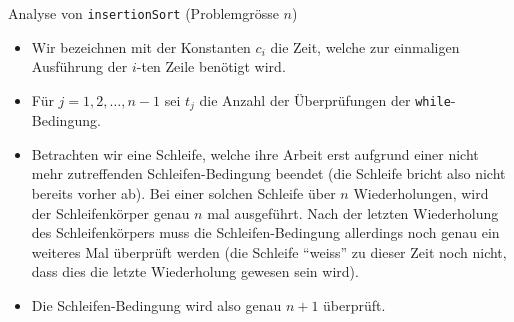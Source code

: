 \begin{frame}{Analyse von \texttt{insertionSort} (Problemgrösse $n$)}
	\begin{itemize}[<+->]
		\item Wir bezeichnen mit der Konstanten $c_i$ die Zeit, welche zur einmaligen Ausführung der $i$-ten Zeile benötigt wird.
		\item Für $j = 1, 2, \ldots, n - 1$ sei $t_j$ die Anzahl der Überprüfungen der \lstinline|while|-Bedingung.
		\item Betrachten wir eine Schleife, welche ihre Arbeit erst aufgrund einer nicht mehr zutreffenden Schleifen-Bedingung beendet (die Schleife bricht also nicht bereits vorher ab).
		      Bei einer solchen Schleife über $n$ Wiederholungen, wird der Schleifenkörper genau $n$ mal ausgeführt.
		      Nach der letzten Wiederholung des Schleifenkörpers muss die Schleifen-Bedingung allerdings noch genau ein weiteres Mal überprüft werden (die Schleife \enquote{weiss} zu dieser Zeit noch nicht, dass dies die letzte Wiederholung gewesen sein wird).
		\item Die Schleifen-Bedingung wird also genau $n+1$ überprüft.
	\end{itemize}
\end{frame}

